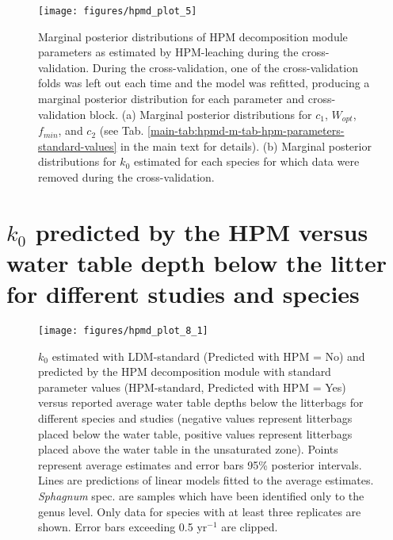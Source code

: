 \documentclass[
  12pt,
]{article}
\begin{document}
\begin{figure}[H]

{\centering \texttt{[image: figures/hpmd\_plot\_5]} 

}

\caption{Marginal posterior distributions of HPM decomposition module parameters as estimated by HPM-leaching during the cross-validation. During the cross-validation, one of the cross-validation folds was left out each time and the model was refitted, producing a marginal posterior distribution for each parameter and cross-validation block. (a) Marginal posterior distributions for \(c_1\), \(W_{opt}\), \(f_{min}\), and \(c_2\) (see Tab. \ref{main-tab:hpmd-m-tab-hpm-parameters-standard-values} in the main text for details). (b) Marginal posterior distributions for \(k_0\) estimated for each species for which data were removed during the cross-validation.}\label{fig:sup-hpmd-plot-5}
\end{figure}

\hypertarget{sup-8}{%
\section{\texorpdfstring{\(k_0\) predicted by the HPM versus water table depth below the litter for different studies and species}{k\_0 predicted by the HPM versus water table depth below the litter for different studies and species}}\label{sup-8}}



\begin{figure}[H]

{\centering \texttt{[image: figures/hpmd\_plot\_8\_1]} 

}

\caption{\(k_0\) estimated with LDM-standard (Predicted with HPM = No) and predicted by the HPM decomposition module with standard parameter values (HPM-standard, Predicted with HPM = Yes) versus reported average water table depths below the litterbags for different species and studies (negative values represent litterbags placed below the water table, positive values represent litterbags placed above the water table in the unsaturated zone). Points represent average estimates and error bars 95\% posterior intervals. Lines are predictions of linear models fitted to the average estimates. \emph{Sphagnum} spec. are samples which have been identified only to the genus level. Only data for species with at least three replicates are shown. Error bars exceeding 0.5 yr\(^{-1}\) are clipped.}\label{fig:sup-hpmd-plot-8-1}
\end{figure}
\end{document}
